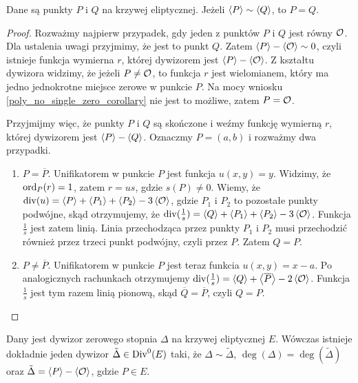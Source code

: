 \begin{lemma}\label{sim_pq_eq_pq_lemma}
Dane są punkty $P$ i $Q$ na krzywej eliptycznej.
Jeżeli $\left\langle P\right\rangle \sim \left\langle Q\right\rangle$,
to $P = Q$.
\end{lemma}

\begin{proof}
Rozważmy najpierw przypadek,
gdy jeden z punktów $P$ i $Q$ jest równy $\mathcal{O}$.
Dla ustalenia uwagi przyjmimy, że jest to punkt $Q$.
Zatem $\left\langle P\right\rangle - \left\langle\mathcal{O}\right\rangle \sim 0$,
czyli istnieje funkcja wymierna $r$,
której dywizorem jest $\left\langle P\right\rangle - \left\langle\mathcal{O}\right\rangle$.
Z kształtu dywizora widzimy, że jeżeli $P \neq \mathcal{O}$, to funkcja $r$
jest wielomianem, który ma jedno jednokrotne miejsce zerowe w punkcie $P$.
Na mocy wniosku \ref{poly_no_single_zero_corollary} nie jest to możliwe,
zatem $P = \mathcal{O}$.

\noindent
Przyjmijmy więc, że punkty $P$ i $Q$ są skończone
i weźmy funkcję wymierną $r$, której dywizorem jest $\left\langle P\right\rangle - \left\langle Q\right\rangle$.
Oznaczmy $P = (a, b)$ i rozważmy dwa przypadki.
\begin{enumerate}
\item $P = \overline{P}$.
Unifikatorem w punkcie $P$ jest funkcja $u(x, y) = y$.
Widzimy, że $\operatorname{ord}_P(r) = 1$, zatem $r = us$, gdzie $s(P) \neq 0$.
Wiemy, że $\operatorname{div}(u) = \left\langle P\right\rangle + \left\langle P_1\right\rangle + \left\langle P_2\right\rangle - 3\left\langle\mathcal{O}\right\rangle$,
gdzie $P_1$ i $P_2$ to pozostałe punkty podwójne,
skąd otrzymujemy, że
$\operatorname{div}(\frac{1}{s}) = \left\langle Q\right\rangle + \left\langle P_1\right\rangle + \left\langle P_2\right\rangle - 3\left\langle\mathcal{O}\right\rangle$.
Funkcja $\frac{1}{s}$ jest zatem linią.
Linia przechodząca przez punkty $P_1$ i $P_2$ musi przechodzić również przez
trzeci punkt podwójny, czyli przez $P$. Zatem $Q = P$.
\item $P \neq \overline{P}$.
Unifikatorem w punkcie $P$ jest teraz funkcia $u(x, y) = x - a$.
Po analogicznych rachunkach otrzymujemy
$\operatorname{div}(\frac{1}{s}) = \left\langle Q\right\rangle + \left\langle\overline{P}\right\rangle - 2\left\langle\mathcal{O}\right\rangle$.
Funkcja $\frac{1}{s}$ jest tym razem linią pionową,
skąd $\overline{Q} = \overline{P}$, czyli $Q = P$.
\end{enumerate}
\end{proof}

\begin{theorem}\label{zerodeg_divisor_linear_reduction_theorem}
Dany jest dywizor zerowego stopnia $\Delta$ na krzywej eliptycznej $E$.
Wówczas istnieje dokładnie jeden dywizor $\tilde{\Delta} \in \operatorname{Div}^0(E)$ taki,
że $\Delta \sim \tilde{\Delta}$, $\deg(\Delta) = \deg(\tilde{\Delta})$
oraz $\tilde{\Delta} = \left\langle P\right\rangle - \left\langle\mathcal{O}\right\rangle$,
gdzie $P \in E$.
\end{theorem}

